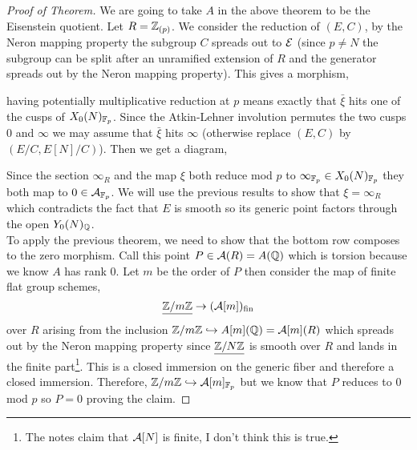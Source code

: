 \documentclass[12pt]{article}
\begin{document}
\begin{proof}[Proof of Theorem]
We are going to take $A$ in the above theorem to be the Eisenstein quotient. Let $R = \mathbb{Z}_{(p)}$. We consider the reduction of $(E, C)$, by the Neron mapping property the subgroup $C$ spreads out to $\mathcal{E}$ (since $p \neq N$ the subgroup can be split after an unramified extension of $R$ and the generator spreads out by the Neron mapping property). This gives a morphism,
\begin{center}
\end{center}
having potentially multiplicative reduction at $p$ means exactly that $\bar{\xi}$ hits one of the cusps of $X_0(N)_{\mathbb{F}_p}$. Since the Atkin-Lehner involution permutes the two cusps $0$ and $\infty$ we may assume that $\bar{\xi}$ hits $\infty$ (otherwise replace $(E, C)$ by $(E/C, E[N]/C)$). Then we get a diagram,
\begin{center}
\end{center}
Since the section $\infty_{R}$ and the map $\xi$ both reduce mod $p$ to $\infty_{\mathbb{F}_p} \in X_0(N)_{\mathbb{F}_p}$ they both map to $0 \in \mathcal{A}_{\mathbb{F}_p}$. We will use the previous results to show that $\xi = \infty_{R}$ which contradicts the fact that $E$ is smooth so its generic point factors through the open $Y_0(N)_{\mathbb{Q}}$. 
\bigskip\\
To apply the previous theorem, we need to show that the bottom row composes to the zero morphism. Call this point $P \in \mathcal{A}(R) = A(\mathbb{Q})$ which is torsion because we know $A$ has rank $0$. Let $m$ be the order of $P$ then consider the map of finite flat group schemes,
\[ \underline{\mathbb{Z} / m \mathbb{Z}} \to (\mathcal{A}[m])_{\mathrm{fin}} \]
over $R$ arising from the inclusion $\mathbb{Z} / m \mathbb{Z} \hookrightarrow A[m](\mathbb{Q}) = \mathcal{A}[m](R)$ which spreads out by the Neron mapping property since $\underline{\mathbb{Z} / N \mathbb{Z}}$ is smooth over $R$ and lands in the finite part\footnote{The notes claim that $\mathcal{A}[N]$ is finite, I don't think this is true.}. This is a closed immersion on the generic fiber and therefore a closed immersion. Therefore, $\mathbb{Z} / m \mathbb{Z} \hookrightarrow \mathcal{A}[m]_{\mathbb{F}_p}$ but we know that $P$ reduces to $0$ mod $p$ so $P = 0$ proving the claim.   
\end{proof}
\end{document}

